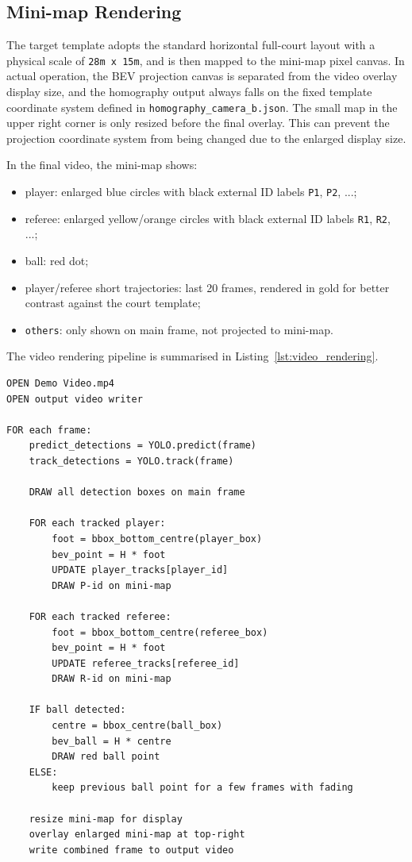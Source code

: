 \documentclass[12pt,a4paper]{article}
\begin{document}
\subsection{Mini-map Rendering}

The target template adopts the standard horizontal full-court layout with a physical scale of \texttt{28m x 15m}, and is then mapped to the mini-map pixel canvas. In actual operation, the BEV projection canvas is separated from the video overlay display size, and the homography output always falls on the fixed template coordinate system defined in \texttt{homography\_camera\_b.json}. The small map in the upper right corner is only resized before the final overlay. This can prevent the projection coordinate system from being changed due to the enlarged display size.

In the final video, the mini-map shows:

\begin{itemize}[leftmargin=1.8em]
    \item player: enlarged blue circles with black external ID labels \texttt{P1}, \texttt{P2}, ...;
    \item referee: enlarged yellow/orange circles with black external ID labels \texttt{R1}, \texttt{R2}, ...;
    \item ball: red dot;
    \item player/referee short trajectories: last 20 frames, rendered in gold for better contrast against the court template;
    \item \texttt{others}: only shown on main frame, not projected to mini-map.
\end{itemize}

The video rendering pipeline is summarised in Listing~\ref{lst:video_rendering}.

\begin{lstlisting}[style=pseudocode,caption={Video rendering with detection, tracking and BEV mini-map.},label={lst:video_rendering}]
OPEN Demo Video.mp4
OPEN output video writer

FOR each frame:
    predict_detections = YOLO.predict(frame)
    track_detections = YOLO.track(frame)

    DRAW all detection boxes on main frame

    FOR each tracked player:
        foot = bbox_bottom_centre(player_box)
        bev_point = H * foot
        UPDATE player_tracks[player_id]
        DRAW P-id on mini-map

    FOR each tracked referee:
        foot = bbox_bottom_centre(referee_box)
        bev_point = H * foot
        UPDATE referee_tracks[referee_id]
        DRAW R-id on mini-map

    IF ball detected:
        centre = bbox_centre(ball_box)
        bev_ball = H * centre
        DRAW red ball point
    ELSE:
        keep previous ball point for a few frames with fading

    resize mini-map for display
    overlay enlarged mini-map at top-right
    write combined frame to output video
\end{lstlisting}
\end{document}
